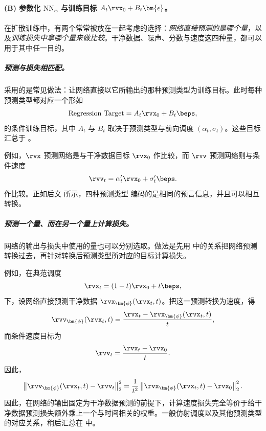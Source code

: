 \paragraph{(B) 参数化 $\mathrm{NN}_{\bm{\phi}}$ 与训练目标 $A_t \rvx_0 + B_t \bm{\epsilon}$。}
\begin{table}[th!]
  \caption{不同参数化之间关系的汇总。
四种参数化在数学上彼此等价，都可以通过简单的代数变换互相转换。
}
  \small
  \centering
  \label{tb:A_t-B_t-parametrizations}
\end{table}
在扩散训练中，有两个常常被放在一起考虑的选择：\emph{网络直接预测的是哪个量}，以及\emph{训练损失中拿哪个量来做比较}。干净数据、噪声、分数与速度这四种量，都可以用于其中任一目的。

\subparagraph{预测与损失相匹配。}
 采用的是常见做法：让网络直接以它所输出的那种预测类型为训练目标。此时每种预测类型都对应一个形如
\[
\text{Regression Target}
=
A_t\rvx_0+B_t\beps,
\]
的条件训练目标，其中 $A_t$ 与 $B_t$ 取决于预测类型与前向调度
$(\alpha_t,\sigma_t)$。这些目标汇总于
。

例如，$\rvx$ 预测网络是与干净数据目标
$\rvx_0$ 作比较，而 $\rvv$ 预测网络则与条件速度
\[
\rvv_t
=
\alpha_t'\rvx_0+\sigma_t'\beps.
\]
作比较。正如后文  所示，四种预测类型
编码的是相同的预言信息，并且可以相互转换。

\subparagraph{预测一个量、而在另一个量上计算损失。}
网络的输出与损失中使用的量也可以分别选取。做法是先用
 中的关系把网络预测转换过去，再针对转换后预测类型所对应的目标计算损失。

例如，在典范调度
\[
\rvx_t=(1-t)\rvx_0+t\beps,
\]
下，设网络直接预测干净数据
$\rvx_{\bm{\phi}}(\rvx_t,t)$。把这一预测转换为速度，得
\[
\rvv_{\bm{\phi}}(\rvx_t,t)
=
\frac{\rvx_t-\rvx_{\bm{\phi}}(\rvx_t,t)}{t},
\]
而条件速度目标为
\[
\rvv_t
=
\frac{\rvx_t-\rvx_0}{t}.
\]
因此，
\[
\left\|
\rvv_{\bm{\phi}}(\rvx_t,t)-\rvv_t
\right\|_2^2
=
\frac{1}{t^2}
\left\|
\rvx_{\bm{\phi}}(\rvx_t,t)-\rvx_0
\right\|_2^2.
\]
因此，在网络的输出固定为干净数据预测的前提下，计算速度损失完全等价于给干净数据预测损失额外乘上一个与时间相关的权重。一般仿射调度以及其他预测类型的对应关系，稍后汇总在  中。

